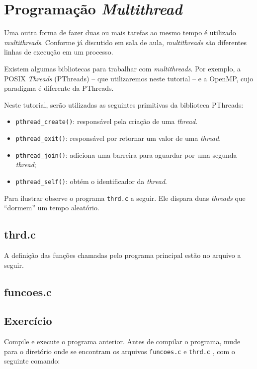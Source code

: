 \chapter{Programação \textit{Multithread}}
Uma outra forma de fazer duas ou mais tarefas ao mesmo tempo é utilizado \textit{multithreads}. Conforme já discutido em sala de aula, \textit{multithreads} são diferentes linhas de execução em um processo.

Existem algumas bibliotecas para trabalhar com \textit{multithreads}. Por exemplo, a POSIX \textit{Threads} (PThreads) -- que utilizaremos neste tutorial -- e a OpenMP, cujo paradigma é diferente da PThreads.

Neste tutorial, serão utilizadas as seguintes primitivas  da biblioteca PThreads:

\begin{itemize}
\setlength{\itemsep}{1pt}\setlength{\parskip}{0pt}  \setlength{\parsep}{0pt}
\item \texttt{pthread\_create()}: responsável pela criação de uma \textit{thread}.
\item \texttt{pthread\_exit()}: responsável por retornar um valor de uma \textit{thread}.
\item \texttt{pthread\_join()}: adiciona uma barreira para aguardar por uma segunda \textit{thread};
\item \texttt{pthread\_self()}: obtém o identificador da \textit{thread}.
\end{itemize}

Para ilustrar observe o programa \texttt{thrd.c} a seguir. Ele dispara duas \textit{threads} que ``dormem'' um tempo aleatório.

\section*{thrd.c}


A definição das funções chamadas pelo programa principal estão no arquivo a seguir.

\section*{funcoes.c}



\section{Exercício}
Compile e execute o programa anterior. Antes de compilar o programa, mude para o diretório onde se encontram os arquivos \texttt{funcoes.c} e \texttt{thrd.c} , com o seguinte comando:

